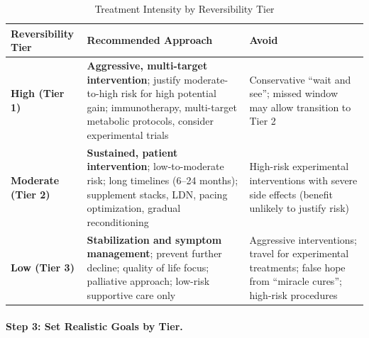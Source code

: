 \begin{table}[htbp]
\centering
\caption{Treatment Intensity by Reversibility Tier}
\label{tab:treatment-intensity-matching}
\small
\begin{tabular}{@{}p{3cm}p{5cm}p{5.5cm}@{}}
\toprule
\textbf{Reversibility Tier} & \textbf{Recommended Approach} & \textbf{Avoid} \\
\midrule
\textbf{High (Tier 1)} & \textbf{Aggressive, multi-target intervention}; justify moderate-to-high risk for high potential gain; immunotherapy, multi-target metabolic protocols, consider experimental trials & Conservative ``wait and see''; missed window may allow transition to Tier 2 \\
\addlinespace
\textbf{Moderate (Tier 2)} & \textbf{Sustained, patient intervention}; low-to-moderate risk; long timelines (6--24 months); supplement stacks, LDN, pacing optimization, gradual reconditioning & High-risk experimental interventions with severe side effects (benefit unlikely to justify risk) \\
\addlinespace
\textbf{Low (Tier 3)} & \textbf{Stabilization and symptom management}; prevent further decline; quality of life focus; palliative approach; low-risk supportive care only & Aggressive interventions; travel for experimental treatments; false hope from ``miracle cures''; high-risk procedures \\
\bottomrule
\end{tabular}
\end{table}

\paragraph{Step 3: Set Realistic Goals by Tier.}

